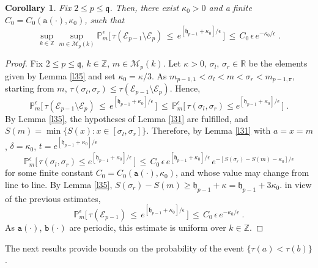\documentclass[reqno]{amsart}
\theoremstyle{plain}
\newtheorem{corollary}[theorem]{Corollary}
\theoremstyle{definition}
\newcommand{\mf}[1]{{\mathfrak #1}}
\newcommand{\bb}[1]{{\mathbb #1}}
\newcommand{\ms}[1]{{\mathscr #1}}
\newcommand{\mtt}[1]{{\mathtt #1}}
\newcommand{\<}{\langle}
\renewcommand{\>}{\rangle}
\begin{document}
\begin{corollary} 
\label{l32}
Fix $2\le p\le \mf q$. Then, there exist $\kappa_0>0$ and a finite
$C_0=C_0(\mtt a(\cdot), \kappa_0)$, such that
\begin{equation*}
\sup_{k\in \bb Z} \sup_{m\in \ms M_p(k)} \bb P_m^{\epsilon}
\big [\, \tau(\ms E_{p-1}\setminus \ms E_p)
\,\le\,  e^{[\mf h_{p-1}+\kappa_0]/\epsilon}  \,\big]
\,\le\, C_0 \, \epsilon \, e^{- \kappa_0/\epsilon}\;.
\end{equation*}
\end{corollary}

\begin{proof}
Fix $2\le p\le \mf q$, $k\in \bb Z$, $m\in \ms M_p(k)$. Let
$\kappa>0$, $\sigma_l$, $\sigma_r\in \bb R$ be the elements given by
Lemma \ref{l35} and set $\kappa_0 = \kappa/3$. As
$m_{p-1, \mtt l} < \sigma_l < m < \sigma_r < m_{p-1, \mtt r}$,
starting from $m$, $\tau(\sigma_l, \sigma_r) \le \tau(\ms
E_{p-1}\setminus \ms E_p)$. Hence,
\begin{equation*}
\bb P_m^{\epsilon} \big [\, \tau(\ms E_{p-1}\setminus \ms E_p) \,\le\,
e^{[\mf h_{p-1}+\kappa_0]/\epsilon} \,\big] \,\le\, \bb P_m^{\epsilon}
\big [\, \tau(\sigma_l, \sigma_r) \le e^{[\mf
h_{p-1}+\kappa_0]/\epsilon} \,\big]\;.
\end{equation*}
By Lemma \ref{l35}, the hypotheses of Lemma \ref{l31} are fulfilled,
and $S(m) = \min \{ S(x) : x\in [\sigma_l, \sigma_r]\}$. Therefore, by
Lemma \ref{l31} with $a = x = m$, $\delta = \kappa_0$,
$t=e^{[\mf h_{p-1}+\kappa_0]/\epsilon}$
\begin{equation*}
\bb P_m^{\epsilon}
\big [\, \tau(\sigma_l, \sigma_r) \le e^{[\mf h_{p-1}+\kappa_0]/\epsilon}
\,\big] \,\le\, C_0\, \epsilon\,  e^{[\mf h_{p-1}+\kappa_0]/\epsilon}
\, e^{- [S(\sigma_r) - S(m) - \kappa_0]/\epsilon}
\end{equation*}
for some finite constant $C_0=C_0(\mtt a(\cdot), \kappa_0)$, and whose
value may change from line to line. By Lemma \ref{l35}, $S(\sigma_r) -
S(m) \ge \mf h_{p-1} + \kappa = \mf h_{p-1} + 3 \kappa_0$. in view of
the previous estimates,
\begin{equation*}
\bb P_m^{\epsilon}
\big [\, \tau(\ms E_{p-1}) \,\le\, e^{[\mf h_{p-1}+\kappa_0]/\epsilon}
\,\big] \,\le\, C_0\,  \epsilon \, e^{- \kappa_0/\epsilon}\;. 
\end{equation*}
As $\mtt a(\cdot)$, $\mtt b(\cdot)$ are periodic, this estimate is
uniform over $k\in\bb Z$.
\end{proof}

The next results provide bounds on the probability of the event
$\{\tau(a) < \tau(b)\}$.
\end{document}
